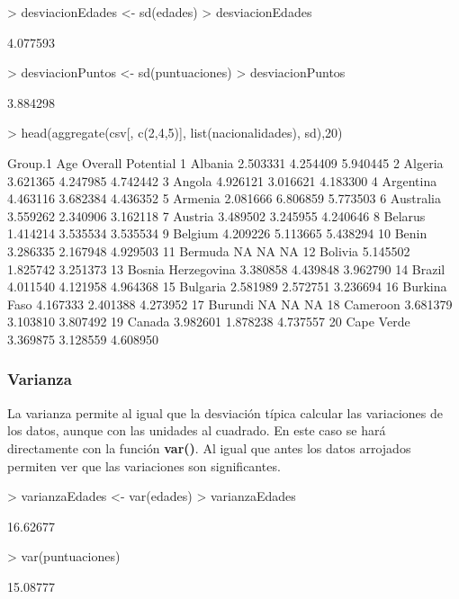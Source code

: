 \documentclass [a4paper] {article}
\begin{document}
\begin{Schunk}
\begin{Sinput}
> desviacionEdades <- sd(edades)
> desviacionEdades 
\end{Sinput}
\begin{Soutput}
[1] 4.077593
\end{Soutput}
\begin{Sinput}
> desviacionPuntos <- sd(puntuaciones)
> desviacionPuntos 
\end{Sinput}
\begin{Soutput}
[1] 3.884298
\end{Soutput}
\begin{Sinput}
> head(aggregate(csv[, c(2,4,5)], list(nacionalidades), sd),20)
\end{Sinput}
\begin{Soutput}
              Group.1      Age  Overall Potential
1             Albania 2.503331 4.254409  5.940445
2             Algeria 3.621365 4.247985  4.742442
3              Angola 4.926121 3.016621  4.183300
4           Argentina 4.463116 3.682384  4.436352
5             Armenia 2.081666 6.806859  5.773503
6           Australia 3.559262 2.340906  3.162118
7             Austria 3.489502 3.245955  4.240646
8             Belarus 1.414214 3.535534  3.535534
9             Belgium 4.209226 5.113665  5.438294
10              Benin 3.286335 2.167948  4.929503
11            Bermuda       NA       NA        NA
12            Bolivia 5.145502 1.825742  3.251373
13 Bosnia Herzegovina 3.380858 4.439848  3.962790
14             Brazil 4.011540 4.121958  4.964368
15           Bulgaria 2.581989 2.572751  3.236694
16       Burkina Faso 4.167333 2.401388  4.273952
17            Burundi       NA       NA        NA
18           Cameroon 3.681379 3.103810  3.807492
19             Canada 3.982601 1.878238  4.737557
20         Cape Verde 3.369875 3.128559  4.608950
\end{Soutput}
\end{Schunk}

\subsubsection{ Varianza}
La varianza permite al igual que la desviación típica calcular las variaciones de los datos, aunque con las unidades al cuadrado. En este caso se
hará directamente con la función \textbf{var()}. Al igual que antes los datos arrojados permiten ver que las variaciones son significantes.

\begin{Schunk}
\begin{Sinput}
> varianzaEdades <- var(edades)
> varianzaEdades 
\end{Sinput}
\begin{Soutput}
[1] 16.62677
\end{Soutput}
\begin{Sinput}
> var(puntuaciones)
\end{Sinput}
\begin{Soutput}
[1] 15.08777
\end{Soutput}
\end{Schunk}
\end{document}

